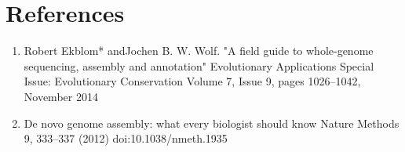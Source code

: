 \section{References}

\begin{enumerate}
  \item Robert Ekblom* andJochen B. W. Wolf. "A field guide to whole-genome sequencing, assembly and annotation" Evolutionary Applications Special Issue: Evolutionary Conservation Volume 7, Issue 9, pages 1026–1042, November 2014
  \item De novo genome assembly: what every biologist should know Nature Methods 9, 333–337 (2012) doi:10.1038/nmeth.1935 
\end{enumerate}
